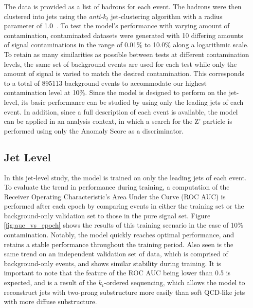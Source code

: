 \documentclass[12pt, a4paper]{article}
\begin{document}
The data is provided as a list of hadrons for each event. The hadrons were then clustered into jets using the \textit{anti-$k_{t}$} jet-clustering algorithm with a radius parameter of 1.0~\cite{Cacciari_2008}. To test the model's performance with varying amount of contamination, contaminated datasets were generated with 10 differing amounts of signal contaminations in the range of 0.01\% to 10.0\% along a logarithmic scale. To retain as many similarities as possible between tests at different contamination levels, the same set of background events are used for each test while only the amount of signal is varied to match the desired contamination. This corresponds to a total of 895113 background events to accommodate our highest contamination level at 10\%. Since the model is designed to perform on the jet-level, its basic performance can be studied by using only the leading jets of each event. In addition, since a full description of each event is available, the model can be applied in an analysis context, in which a search for the Z' particle is performed using only the Anomaly Score as a discriminator.


\subsection{Jet Level}


In this jet-level study, the model is trained on only the leading jets of each event. To evaluate the trend in performance during training, a computation of the Receiver Operating Characteristic's Area Under the Curve (ROC AUC) is performed after each epoch by comparing events in either the training set or the background-only validation set to those in the pure signal set. Figure \ref{fig:auc_vs_epoch} shows the results of this training scenario in the case of 10\% contamination. Notably, the model quickly reaches optimal performance, and retains a stable performance throughout the training period. Also seen is the same trend on an independent validation set of data, which is comprised of background-only events, and shows similar stability during training. It is important to note that the feature of the ROC AUC being lower than 0.5 is expected, and is a result of the $k_{t}$-ordered sequencing, which allows the model to reconstruct jets with two-prong substructure more easily than soft QCD-like jets with more diffuse substructure.
\end{document}
